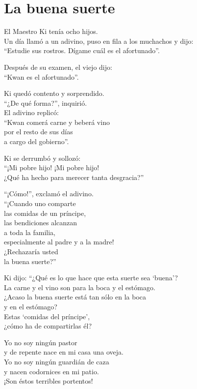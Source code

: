 \documentclass[hidelinks]{memoir}
\begin{document}
	\chapter*{La buena suerte}
	
	El Maestro Ki tenía ocho hijos.\\
	Un día llamó a un adivino, puso en fila a los muchachos y dijo:\\
	``Estudie sus rostros. Dígame cuál es el afortunado''.
	
	Después de su examen, el viejo dijo:\\
	``Kwan es el afortunado''.
	
	Ki quedó contento y sorprendido.\\
	``¿De qué forma?'', inquirió.\\
	El adivino replicó:\\
	``Kwan comerá carne y beberá vino\\
	por el resto de sus días\\
	a cargo del gobierno''.
	
	Ki se derrumbó y sollozó:\\
	``¡Mi pobre hijo! ¡Mi pobre hijo!\\
	¿Qué ha hecho para merecer tanta desgracia?''
	
	``¡Cómo!'', exclamó el adivino.\\
	``¡Cuando uno comparte\\
	las comidas de un príncipe,\\
	las bendiciones alcanzan\\
	a toda la familia,\\
	especialmente al padre y a la madre!\\
	¿Rechazaría usted\\
	la buena suerte?''
	
	Ki dijo: ``¿Qué es lo que hace que esta suerte sea `buena'?\\
	La carne y el vino son para la boca y el estómago.\\
	¿Acaso la buena suerte está tan sólo en la boca\\
	y en el estómago?\\
	Estas `comidas del príncipe',\\
	¿cómo ha de compartirlas él?
	
	Yo no soy ningún pastor\\
	y de repente nace en mi casa una oveja.\\
	Yo no soy ningún guardián de caza\\
	y nacen codornices en mi patio.\\
	¡Son éstos terribles portentos!
	
\end{document}
